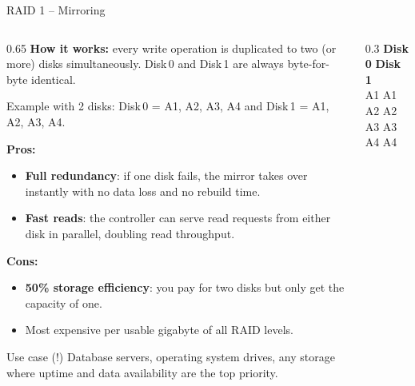 \begin{frame}{RAID 1 -- Mirroring}
  \begin{columns}
    \begin{column}{0.65\textwidth}
      \textbf{How it works:} every write operation is duplicated to two (or more) disks
      simultaneously. Disk\,0 and Disk\,1 are always byte-for-byte identical.

      \medskip
      Example with 2 disks: Disk\,0 = A1, A2, A3, A4 and Disk\,1 = A1, A2, A3, A4.

      \medskip
      \textbf{Pros:}
      \begin{itemize}
        \item \textbf{Full redundancy}: if one disk fails, the mirror takes over instantly with no
              data loss and no rebuild time.
        \item \textbf{Fast reads}: the controller can serve read requests from either disk in
              parallel, doubling read throughput.
      \end{itemize}

      \textbf{Cons:}
      \begin{itemize}
        \item \textbf{50\% storage efficiency}: you pay for two disks but only get the capacity of
              one.
        \item Most expensive per usable gigabyte of all RAID levels.
      \end{itemize}

      \begin{examples}{Use case (!)}
        Database servers, operating system drives, any storage where uptime and data availability
        are the top priority.
      \end{examples}
    \end{column}
    \begin{column}{0.3\textwidth}
      \centering
      \textbf{Disk 0} \quad \textbf{Disk 1}\\[4pt]
      A1 \quad A1\\
      A2 \quad A2\\
      A3 \quad A3\\
      A4 \quad A4\\
    \end{column}
  \end{columns}
\end{frame}

